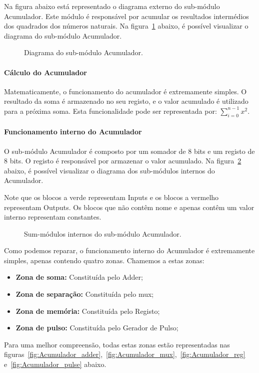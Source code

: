 Na figura abaixo está representado o diagrama externo do sub-módulo Acumulador. Este módulo é responsável por acumular os resultados intermédios dos quadrados dos números naturais. Na figura~\ref{fig:Acumulador} abaixo, é possível visualizar o diagrama do sub-módulo Acumulador.

\begin{figure}[H]
    \centering
    
    \caption{Diagrama do sub-módulo Acumulador.}\label{fig:Acumulador}
\end{figure}

\paragraph{Cálculo do Acumulador}
Matematicamente, o funcionamento do acumulador é extremamente simples. O resultado da soma é armazenado no seu registo, e o valor acumulado é utilizado para a próxima soma. Esta funcionalidade pode ser representada por: $\sum\limits_{i=0}^{n-1} x^2$.

\paragraph{Funcionamento interno do Acumulador}
O sub-módulo Acumulador é composto por um somador de 8 bits e um registo de 8 bits. O registo é responsável por armazenar o valor acumulado. Na figura~\ref{fig:Acumulador_subsub} abaixo, é possível visualizar o diagrama dos sub-módulos internos do Acumulador.

\begin{infoclean}
    Note que os blocos a verde representam Inputs e os blocos a vermelho representam Outputs. Os blocos que não contêm nome e apenas contêm um valor interno representam constantes.
\end{infoclean}

\begin{figure}[H]
    \centering
    
    \caption{Sum-módulos internos do sub-módulo Acumulador.}\label{fig:Acumulador_subsub}
\end{figure}

Como podemos reparar, o funcionamento interno do Acumulador é extremamente simples, apenas contendo quatro zonas. Chamemos a estas zonas:
\begin{itemize}
    \item \textbf{Zona de soma: }Constituída pelo Adder;
    \item \textbf{Zona de separação: }Constituída pelo \Gls{mux};
    \item \textbf{Zona de memória: }Constituída pelo Registo;
    \item \textbf{Zona de pulso: }Constituída pelo Gerador de Pulso;
\end{itemize}
Para uma melhor compreensão, todas estas zonas estão representadas nas figuras~\ref{fig:Acumulador_adder},~\ref{fig:Acumulador_mux},~\ref{fig:Acumulador_reg} e~\ref{fig:Acumulador_pulse} abaixo.

